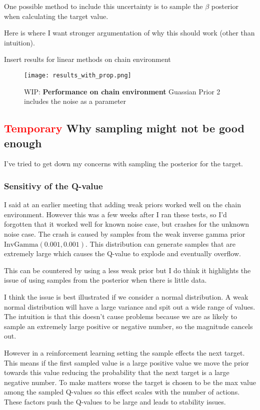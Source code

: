 One possible method to include this uncertainty is to sample the $\beta$ posterior when calculating the target value.

\todo Here is where I want stronger argumentation of why this should work (other than intuition).

\todo Insert results for linear methods on chain environment

\begin{figure}[H]
    \centering
    \texttt{[image: results\_with\_prop.png]}
    \caption{WIP: \textbf{Performance on chain environment} Guassian Prior 2 includes the noise as a parameter}
    \label{fig:results_no_propr}
\end{figure}

\subsection{\textcolor{red}{Temporary} Why sampling might not be good enough}

I've tried to get down my concerns with sampling the posterior for the target.
 
\subsubsection{Sensitivy of the Q-value}

I said at an earlier meeting that adding weak priors worked well on the chain environment. However this was a few weeks after I ran these tests, so I'd forgotten that it worked well for known noise case, but crashes for the unknown noise case. The crash is caused by samples from the weak inverse gamma prior $\text{InvGamma}(0.001, 0.001)$. This distribution can generate samples that are extremely large which causes the Q-value to explode and eventually overflow.

This can be countered by using a less weak prior but I do think it highlights the issue of using samples from the posterior when there is little data.

I think the issue is best illustrated if we consider a normal distribution. A weak normal distribution will have a large variance and spit out a wide range of values. The intuition is that this doesn't cause problems because we are as likely to sample an extremely large positive or negative number, so the magnitude cancels out.

However in a reinforcement learning setting the sample effects the next target. This means if the first sampled value is a large positive value we move the prior towards this value reducing the probability that the next target is a large negative number. To make matters worse the target is chosen to be the max value among the sampled Q-values so this effect scales with the number of actions. These factors push the Q-values to be large and leads to stability issues.

